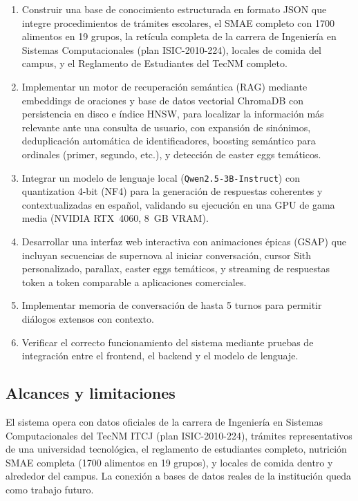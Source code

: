 \begin{enumerate}
    \item Construir una base de conocimiento estructurada en formato JSON que integre procedimientos de trámites escolares, el SMAE completo con 1700 alimentos en 19 grupos, la retícula completa de la carrera de Ingeniería en Sistemas Computacionales (plan ISIC-2010-224), locales de comida del campus, y el Reglamento de Estudiantes del TecNM completo.
    \item Implementar un motor de recuperación semántica (RAG) mediante embeddings de oraciones y base de datos vectorial ChromaDB con persistencia en disco e índice HNSW, para localizar la información más relevante ante una consulta de usuario, con expansión de sinónimos, deduplicación automática de identificadores, boosting semántico para ordinales (primer, segundo, etc.), y detección de easter eggs temáticos.
    \item Integrar un modelo de lenguaje local (\texttt{Qwen2.5-3B-Instruct}) con quantization 4-bit (NF4) para la generación de respuestas coherentes y contextualizadas en español, validando su ejecución en una GPU de gama media (NVIDIA RTX~4060, 8~GB VRAM).
    \item Desarrollar una interfaz web interactiva con animaciones épicas (GSAP) que incluyan secuencias de supernova al iniciar conversación, cursor Sith personalizado, parallax, easter eggs temáticos, y streaming de respuestas token a token comparable a aplicaciones comerciales.
    \item Implementar memoria de conversación de hasta 5 turnos para permitir diálogos extensos con contexto.
    \item Verificar el correcto funcionamiento del sistema mediante pruebas de integración entre el frontend, el backend y el modelo de lenguaje.
\end{enumerate}

\subsection{Alcances y limitaciones}

El sistema opera con datos oficiales de la carrera de Ingeniería en Sistemas Computacionales del TecNM ITCJ (plan ISIC-2010-224), trámites representativos de una universidad tecnológica, el reglamento de estudiantes completo, nutrición SMAE completa (1700 alimentos en 19 grupos), y locales de comida dentro y alrededor del campus. La conexión a bases de datos reales de la institución queda como trabajo futuro.

